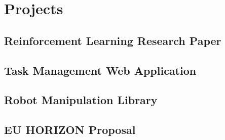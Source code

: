 \chapter{Projects}
\glsresetall

\section{Reinforcement Learning Research Paper}

\section{Task Management Web Application}

\section{Robot Manipulation Library}

\section{EU HORIZON Proposal}

